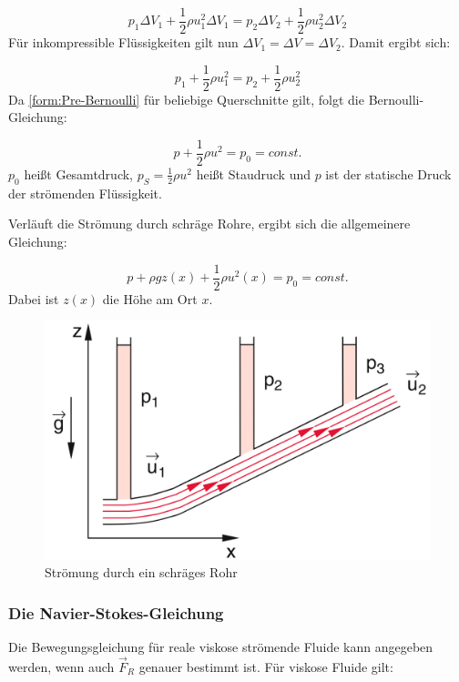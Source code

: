 \begin{equation}
p_1 \Delta V_1 + \frac{1}{2} \rho u_1^2 \Delta V_1 = p_2 \Delta V_2 + \frac{1}{2} \rho u_2^2 \Delta V_2
\end{equation}
Für inkompressible Flüssigkeiten gilt nun $ \Delta V_1 = \Delta V = \Delta V_2 $. Damit ergibt sich:

\begin{equation}
p_1 + \frac{1}{2} \rho u_1^2 = p_2 + \frac{1}{2} \rho u_2^2
\label{form:Pre-Bernoulli}
\end{equation}
Da \ref{form:Pre-Bernoulli} für beliebige Querschnitte gilt, folgt die Bernoulli-Gleichung:

\begin{equation}
\boxed{p + \frac{1}{2} \rho u^2 = p_0 = const.}
\label{form:Bernoulli-Gleichung}
\end{equation}
$ p_0 $ heißt Gesamtdruck, $ p_S = \frac{1}{2} \rho u^2 $ heißt Staudruck und $p$ ist der statische Druck der strömenden Flüssigkeit.

Verläuft die Strömung durch schräge Rohre, ergibt sich die allgemeinere Gleichung:

\begin{equation}
p + \rho g z(x) + \frac{1}{2} \rho u^2(x) = p_0 = const.
\end{equation}
Dabei ist $z(x)$ die Höhe am Ort $x$.

\begin{figure}
	\centering
        \includegraphics[width=.9\textwidth]{images/8-11}
\caption{ Strömung durch ein schräges Rohr }
\label{fig:8-11}
\end{figure}

\subsubsection{Die Navier-Stokes-Gleichung}
Die Bewegungsgleichung für reale viskose strömende Fluide kann angegeben werden, wenn auch $ \vec{F}_R $ genauer bestimmt ist. Für viskose Fluide gilt:

